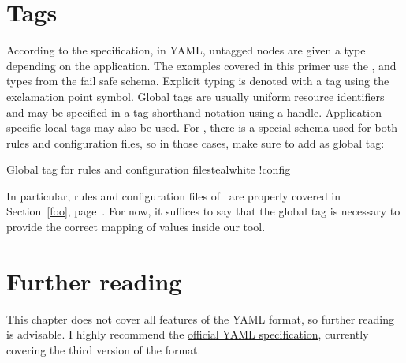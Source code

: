 \section{Tags}
\label{sec:tags}

According to the specification, in YAML, untagged nodes are given a type depending on the application. The examples covered in this primer use the ,  and  types from the fail safe schema. Explicit typing is denoted with a tag using the exclamation point symbol. Global tags are usually uniform resource identifiers and may be specified in a tag shorthand notation using a handle. Application-specific local tags may also be used. For \arara, there is a special schema used for both rules and configuration files, so in those cases, make sure to add  as global tag:

\begin{codebox}{Global tag for rules and configuration files}{teal}{\icnote}{white}
!config
\end{codebox}

In particular, rules and configuration files of \arara\ are properly covered in Section~\ref{foo}, page~\pageref{foo}. For now, it suffices to say that the  global tag is necessary to provide the correct mapping of values inside our tool.

\section{Further reading}
\label{sec:furtherreading}

This chapter does not cover all features of the YAML format, so further reading is advisable. I highly recommend the \href{http://yaml.org/spec/1.2/spec.html}{official YAML specification}, currently covering the third version of the format.
